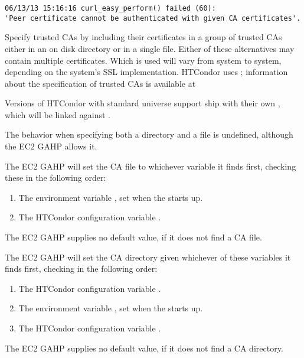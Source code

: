 \footnotesize
\begin{verbatim}
06/13/13 15:16:16 curl_easy_perform() failed (60): 
'Peer certificate cannot be authenticated with given CA certificates'.
\end{verbatim}
\normalsize

Specify trusted CAs by including their certificates in a group of trusted CAs
either in an on disk directory or in a single file. 
Either of these alternatives may contain multiple certificates.  
Which is used will vary from system to system, 
depending on the system's SSL implementation. 
HTCondor uses ; 
information about the  specification of trusted CAs
is available at 


Versions of HTCondor with standard universe support ship with their 
own , which will be linked against .

The behavior when specifying both a directory and a file is undefined, 
although the EC2 GAHP allows it.

The EC2 GAHP will set the CA file to whichever variable it finds first, 
checking these in the following order:

\begin{enumerate}
\item The environment variable ,
  set when the  starts up.
\item The HTCondor configuration variable .
\end{enumerate}

The EC2 GAHP supplies no default value, if it does not find a CA file.

The EC2 GAHP will set the CA directory given whichever of these
variables it finds first, 
checking in the following order:

\begin{enumerate}
\item The HTCondor configuration variable .
\item The environment variable ,
  set when the  starts up.
\item The HTCondor configuration variable .
\end{enumerate}

The EC2 GAHP supplies no default value, if it does not find a CA directory.


